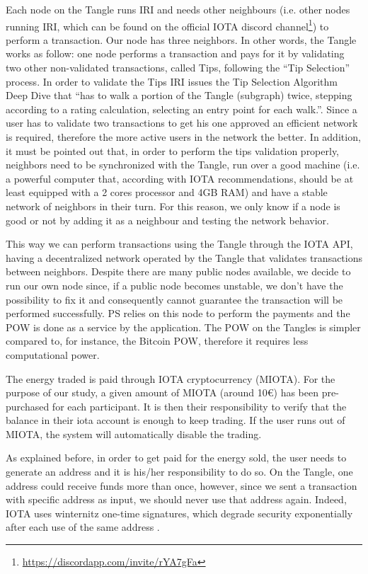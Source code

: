 Each node on the Tangle runs \ac{IRI} and needs other neighbours (i.e. other nodes running \ac{IRI}, which can be found on the official IOTA discord channel\footnote{\url{https://discordapp.com/invite/rYA7gFa}}) to perform a transaction.  Our node has three neighbors. In other words, the Tangle works as follow: one node performs a transaction and pays for it by validating two other non-validated transactions, called Tips, following the “Tip Selection” process. In order to validate the Tips \ac{IRI} issues the Tip Selection Algorithm Deep Dive that “has to walk a portion of the Tangle (subgraph) twice, stepping according to a rating calculation, selecting an entry point for each walk.”\cite{iotatips}. Since a user has to validate two transactions to get his one approved an efficient network is required, therefore the more active users in the network the better. In addition, it must be pointed out that, in order to perform the tips validation properly, neighbors need to be synchronized with the Tangle, run over a good machine (i.e. a powerful computer that, according with IOTA recommendations, should be at least equipped with a 2 cores processor and 4GB RAM) and have a stable network of neighbors in their turn. For this reason, we only know if a node is good or not by adding it as a neighbour and testing the network behavior. 


This way we can perform transactions using the Tangle through the IOTA \ac{API}, having a decentralized network operated by the Tangle that validates transactions between neighbors. Despite there are many public nodes available, we decide to run our own node since, if a public node becomes unstable, we don't have the possibility to fix it and consequently cannot guarantee the transaction will be performed successfully.  \ac{PS} relies on this node to perform the payments and the \ac{POW} is done as a service by the application. The POW on the Tangles is simpler compared to, for instance, the Bitcoin \ac{POW}, therefore it requires less computational power.



The energy traded is paid through IOTA cryptocurrency (MIOTA). For the purpose of our study, a given amount of MIOTA (around 10€) has been pre-purchased for each participant. It is then their responsibility to verify that the balance in their iota account is enough to keep trading. If the user runs out of MIOTA, the system will automatically disable the trading. 


As explained before, in order to get paid for the energy sold, the user needs to generate an address and it is his/her responsibility to do so. On the Tangle, one address could receive funds more than once, however, since we sent a transaction with specific address as input, we should never use that address again. Indeed, IOTA uses winternitz one-time signatures, which degrade security exponentially after each use of the same address \cite{iotaseeds}.



